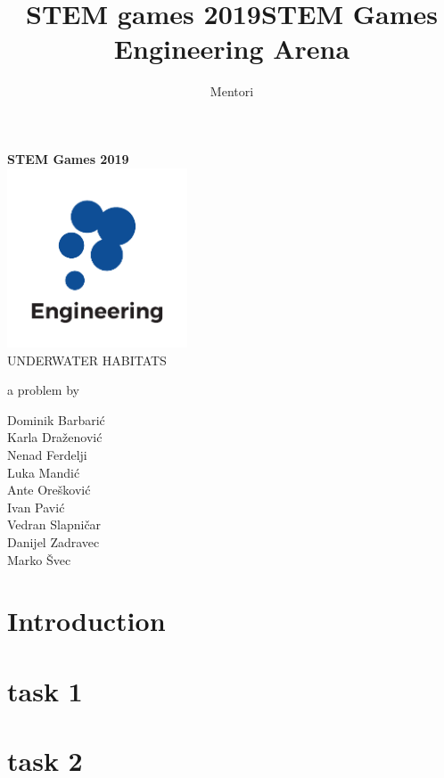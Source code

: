 \documentclass{article}
\title{STEM games 2019}
\author{Mentori}
\title{STEM Games Engineering Arena}
\date{}
\begin{document}
	
	\thispagestyle{empty}
	\newpage
	\thispagestyle{empty}
	\vspace*{0cm}
	\begin{center}
		
		\textbf{\Huge{STEM Games 2019}}\\
		\vspace*{2.4cm}
		\includegraphics[width=0.4\textwidth]{logos/engineering} \\
		\vspace*{2.4cm}
		\huge{UNDERWATER HABITATS}
		
		\medskip
		
		\normalsize{a problem by}
		
		\medskip
		
		Dominik Barbarić \\
		Karla Draženović \\
		Nenad Ferdelji \\
		Luka Mandić \\
		Ante Orešković \\
		Ivan Pavić \\
		Vedran Slapničar \\
		Danijel Zadravec \\
		Marko Švec 
		
		\vspace{6cm}
		
		
		\normalsize{}
	\end{center}
	
	\newpage
	
	\section{Introduction}
	
	
	\section{task 1}
	
	\section{task 2}
	
	
	
\end{document}
